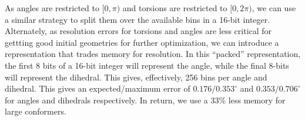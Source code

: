 \documentclass[%
 preprint,
superscriptaddress,
 amsmath,amssymb,
 aip,
 jcp,
]{revtex4-2}
\begin{document}

As angles are restricted to $[0,\pi)$ and torsions are restricted to $[0, 2\pi)$, we can use a similar strategy to split them over the available bins in a 16-bit integer.
Alternately, as resolution errors for torsions and angles are less critical for gettting good initial geometries for further optimization, we can introduce a representation that trades memory for resolution.
In this ``packed'' representation, the first 8 bits of a 16-bit integer will represent the angle, while the final 8-bits will represent the dihedral.
This gives, effectively, 256 bins per angle and dihedral.
This gives an expected/maximum error of $0.176/0.353^\circ$ and $0.353/0.706^\circ$ for angles and dihedrals respectively.
In return, we use a 33\% less memory for large conformers. 
\end{document}

